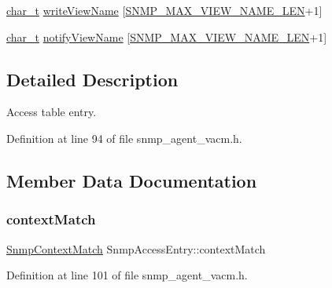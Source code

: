 \begin{DoxyCompactItemize}
\item 
\hyperlink{compiler__port_8h_a40bb5262bf908c328fbcfbe5d29d0201}{char\+\_\+t} \hyperlink{structSnmpAccessEntry_a44bdb9c26c3158808b9c65daa418b8ce}{write\+View\+Name} \mbox{[}\hyperlink{snmp__common_8h_a8188d8ada88e9fc2c0a6d2010105b14c}{S\+N\+M\+P\+\_\+\+M\+A\+X\+\_\+\+V\+I\+E\+W\+\_\+\+N\+A\+M\+E\+\_\+\+L\+EN}+1\mbox{]}
\item 
\hyperlink{compiler__port_8h_a40bb5262bf908c328fbcfbe5d29d0201}{char\+\_\+t} \hyperlink{structSnmpAccessEntry_a55d2f13d5f46593a17b29a88293b29e2}{notify\+View\+Name} \mbox{[}\hyperlink{snmp__common_8h_a8188d8ada88e9fc2c0a6d2010105b14c}{S\+N\+M\+P\+\_\+\+M\+A\+X\+\_\+\+V\+I\+E\+W\+\_\+\+N\+A\+M\+E\+\_\+\+L\+EN}+1\mbox{]}
\end{DoxyCompactItemize}


\subsection{Detailed Description}
Access table entry. 

Definition at line 94 of file snmp\+\_\+agent\+\_\+vacm.\+h.



\subsection{Member Data Documentation}
\mbox{\label{structSnmpAccessEntry_a01114d52380d6cf6d57407e9af503bf0}} 
\subsubsection{\texorpdfstring{context\+Match}{contextMatch}}
{\footnotesize\ttfamily \hyperlink{snmp__agent__vacm_8h_a8cef40e8881cb290d68171da147f6f20}{Snmp\+Context\+Match} Snmp\+Access\+Entry\+::context\+Match}



Definition at line 101 of file snmp\+\_\+agent\+\_\+vacm.\+h.

\mbox{\label{structSnmpAccessEntry_aed0f5f189ab50350b9e50d28a65faa39}} 
